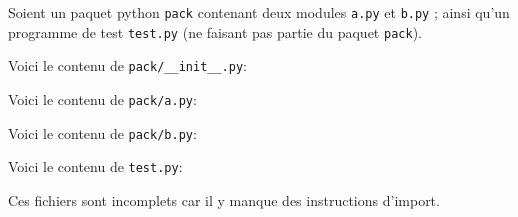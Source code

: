 
Soient un paquet python \texttt{pack} contenant deux modules
\texttt{a.py} et \texttt{b.py} ; ainsi qu'un programme de test
\texttt{test.py} (ne faisant pas partie du paquet \texttt{pack}).

Voici le contenu de \texttt{pack/\_\_init\_\_.py}:


Voici le contenu de \texttt{pack/a.py}:


Voici le contenu de \texttt{pack/b.py}:


Voici le contenu de \texttt{test.py}:


Ces fichiers sont incomplets car il y manque des instructions
d'import.
